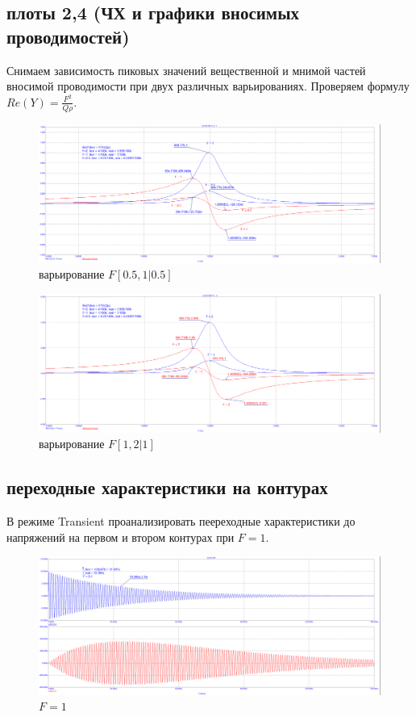 \documentclass[a4paper, 14pt]{extarticle}%
\begin{document}
\subsection{плоты 2,4 (ЧХ и графики вносимых проводимостей)}

Снимаем зависимость пиковых значений вещественной и мнимой частей вносимой проводимости при двух различных варьированиях.
\newline
Проверяем формулу $Re(Y) = \frac{F^{2}}{Q\rho}$.

\begin{figure}[h!]
	\centering
			\includegraphics[width=1.1\linewidth]{908_work/9_1.png}
            \caption{варьирование $F [0.5, 1|0.5]$}
	\label{A}
\end{figure}


\begin{figure}[h!]
	\centering
			\includegraphics[width=1.1\linewidth]{908_work/9_2.png}
            \caption{варьирование $F [1, 2|1]$}
	\label{A}
\end{figure}


\subsection{переходные характеристики на контурах}

В режиме Transient проанализировать пеереходные характеристики до напряжений на первом и втором контурах при $ F  = 1$. 


\begin{figure}[h!]
	\centering
			\includegraphics[width=1.1\linewidth]{908_work/10_2.png}
            \caption{$F = 1$}
	\label{A}
\end{figure}
\end{document}
